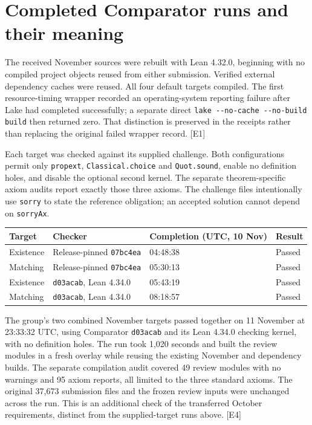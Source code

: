 \documentclass[11pt]{article}
\newcommand{\code}[1]{{\small\nolinkurl{#1}}}
\newcommand{\src}[1]{\textsf{[#1]}}
\begin{document}
\section{Completed Comparator runs and their meaning}
\label{sec:verification}

The received November sources were rebuilt with Lean 4.32.0, beginning with
no compiled project objects reused from either submission. Verified external
dependency caches were reused. All four default targets compiled. The first
resource-timing wrapper recorded an operating-system reporting failure after
Lake had completed successfully; a separate direct
\code{lake --no-cache --no-build build} then returned zero. That distinction
is preserved in the receipts rather than replacing the original failed
wrapper record. \src{E1}

Each target was checked against its supplied challenge. Both configurations
permit only \code{propext}, \code{Classical.choice} and \code{Quot.sound},
enable no definition holes, and disable the optional second kernel. The
separate theorem-specific axiom audits report exactly those three axioms.
The challenge files intentionally use \code{sorry} to state the reference
obligation; an accepted solution cannot depend on \code{sorryAx}.

\begin{center}\small
\begin{tabular}{llll}
\toprule Target & Checker & Completion (UTC, 10 Nov) & Result\\\midrule
Existence & Release-pinned \code{07bc4ea} & 04:48:38 & Passed\\
Matching & Release-pinned \code{07bc4ea} & 05:30:13 & Passed\\
Existence & \code{d03acab}, Lean 4.34.0 & 05:43:19 & Passed\\
Matching & \code{d03acab}, Lean 4.34.0 & 08:18:57 & Passed\\\bottomrule
\end{tabular}
\end{center}

The group's two combined November targets passed together on 11 November
at 23:33:32 UTC, using Comparator \code{d03acab} and its Lean 4.34.0
checking kernel, with no definition holes. The run took 1,020 seconds and
built the review modules in a fresh overlay while reusing the existing
November and dependency builds. The separate compilation audit covered 49
review modules with no warnings and 95 axiom reports, all limited to the
three standard axioms. The original 37,673 submission files and the frozen
review inputs were unchanged across the run. This is an additional check
of the transferred October requirements, distinct from the supplied-target
runs above. \src{E4}
\end{document}
